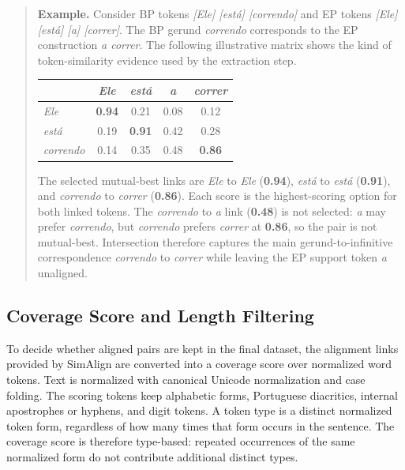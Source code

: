 \begin{quote}
\textbf{Example.} Consider BP tokens
\textit{[Ele] [est\'a] [correndo]} and EP tokens
\textit{[Ele] [est\'a] [a] [correr]}. The BP gerund
\textit{correndo} corresponds to the EP construction
\textit{a correr}. The following illustrative matrix shows the kind of
token-similarity evidence used by the extraction step.

\begin{center}
\thesistablefont
\begin{tabular}{lcccc}
\toprule
 & \textit{Ele} & \textit{est\'a} & \textit{a} & \textit{correr} \\
\midrule
\textit{Ele} & \cellcolor{lightgray}\textbf{0.94} & 0.21 & 0.08 & 0.12 \\
\textit{est\'a} & 0.19 & \cellcolor{lightgray}\textbf{0.91} & 0.42 & 0.28 \\
\textit{correndo} & 0.14 & 0.35 & 0.48 & \cellcolor{lightgray}\textbf{0.86} \\
\bottomrule
\end{tabular}
\end{center}

The selected mutual-best links are \textit{Ele}
to \textit{Ele} (\textbf{0.94}), \textit{est\'a}
to \textit{est\'a} (\textbf{0.91}), and \textit{correndo}
to \textit{correr} (\textbf{0.86}). Each score is the
highest-scoring option for both linked tokens. The \textit{correndo}
to \textit{a} link (\textbf{0.48}) is not selected: \textit{a}
may prefer \textit{correndo}, but \textit{correndo} prefers \textit{correr} at
\textbf{0.86}, so the pair is not mutual-best. Intersection therefore captures
the main gerund-to-infinitive correspondence \textit{correndo}
to \textit{correr} while leaving the EP support token \textit{a}
unaligned.
\end{quote}

\subsection{Coverage Score and Length Filtering}

To decide whether aligned pairs are kept in the final dataset, the alignment
links provided by SimAlign are converted into a coverage score over normalized
word tokens. Text is normalized with canonical Unicode normalization and case
folding. The scoring tokens keep alphabetic forms, Portuguese diacritics,
internal apostrophes or hyphens, and digit tokens. A token type is a distinct
normalized token form, regardless of how many times that form occurs in the
sentence. The coverage score is therefore type-based: repeated occurrences of
the same normalized form do not contribute additional distinct types.

